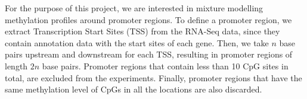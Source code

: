For the purpose of this project, we are interested in mixture modelling methylation profiles around promoter regions. To define a promoter region, we extract Transcription Start Sites (TSS) from the RNA-Seq data, since they contain annotation data with the start sites of each gene. Then, we take $n$ base pairs upstream and downstream for each TSS, resulting in promoter regions of length $2n$ base pairs. Promoter regions that contain less than 10 CpG sites in total, are excluded from the experiments. Finally, promoter regions that have the same methylation level of CpGs in all the locations are also discarded. 

